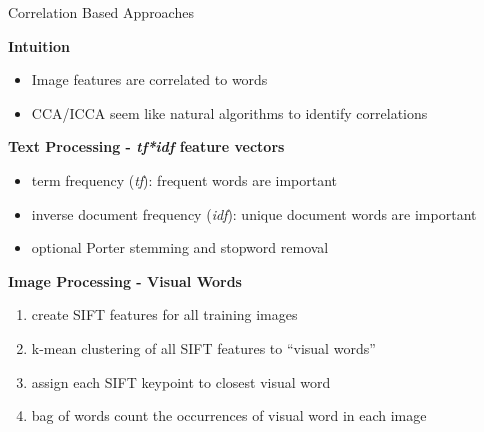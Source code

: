 \documentclass[8pt]{beamer}
\begin{document}
\begin{frame}{Correlation Based Approaches}

  \textbf{Intuition}
  \begin{itemize}
  \item Image features are correlated to words
  \item CCA/ICCA seem like natural algorithms to identify correlations
  \end{itemize}

  \vspace{2ex}

  \textbf{Text Processing - \textit{\textcolor{textred}{tf}*\textcolor{texthigh}{idf}} feature vectors}
  \begin{itemize}
  \item \textcolor{textred}{term frequency} (\textit{tf}): frequent words are important
  \item \textcolor{texthigh}{inverse document frequency} (\textit{idf}): unique document words are important
  \item optional Porter stemming and stopword removal
  \end{itemize}

  \vspace{2ex}

  \textbf{Image Processing - Visual Words}
  \begin{enumerate}
  \item create SIFT features for all training images
  \item k-mean clustering of all SIFT features to ``visual words''
  \item assign each SIFT keypoint to closest visual word
  \item bag of words count the occurrences of visual word in each image
  \end{enumerate}

\end{frame}
\end{document}
